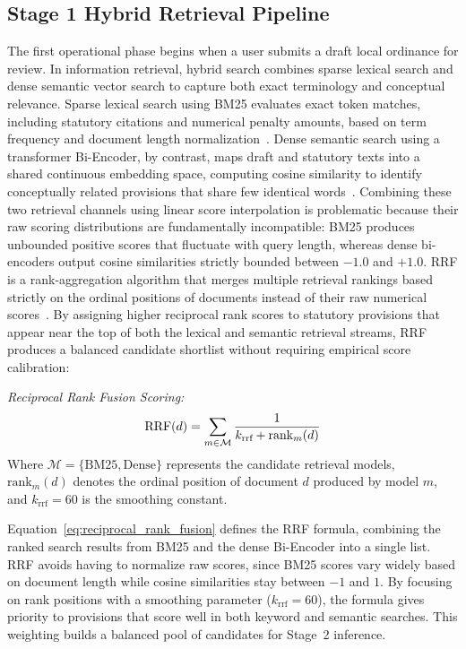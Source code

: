     \subsection{Stage 1 Hybrid Retrieval Pipeline}
    \label{sec:stage1_hybrid_pipeline}
    The first operational phase begins when a user submits a draft local ordinance for review. In information retrieval, hybrid search combines sparse lexical search and dense semantic vector search to capture both exact terminology and conceptual relevance. Sparse lexical search using BM25 evaluates exact token matches, including statutory citations and numerical penalty amounts, based on term frequency and document length normalization~\cite{robertson2009probabilistic}. Dense semantic search using a transformer Bi-Encoder, by contrast, maps draft and statutory texts into a shared continuous embedding space, computing cosine similarity to identify conceptually related provisions that share few identical words~\cite{reimers2019sentencebert}. Combining these two retrieval channels using linear score interpolation is problematic because their raw scoring distributions are fundamentally incompatible: BM25 produces unbounded positive scores that fluctuate with query length, whereas dense bi-encoders output cosine similarities strictly bounded between $-1.0$ and $+1.0$. RRF is a rank-aggregation algorithm that merges multiple retrieval rankings based strictly on the ordinal positions of documents instead of their raw numerical scores~\cite{cormack2009reciprocal}. By assigning higher reciprocal rank scores to statutory provisions that appear near the top of both the lexical and semantic retrieval streams, RRF produces a balanced candidate shortlist without requiring empirical score calibration:

    \noindent\textit{Reciprocal Rank Fusion Scoring:}
    \begin{equation}
        \text{RRF}(d) = \sum_{m \in \mathcal{M}} \frac{1}{k_{\text{rrf}} + \text{rank}_m(d)}
        \label{eq:reciprocal_rank_fusion}
        \eqcaption{Reciprocal Rank Fusion (RRF) Scoring}
    \end{equation}
    \noindent Where $\mathcal{M} = \{\text{BM25}, \text{Dense}\}$ represents the candidate retrieval models, $\text{rank}_m(d)$ denotes the ordinal position of document $d$ produced by model $m$, and $k_{\text{rrf}} = 60$ is the smoothing constant.

    Equation~\ref{eq:reciprocal_rank_fusion} defines the RRF formula, combining the ranked search results from BM25 and the dense Bi-Encoder into a single list. RRF avoids having to normalize raw scores, since BM25 scores vary widely based on document length while cosine similarities stay between $-1$ and $1$. By focusing on rank positions with a smoothing parameter ($k_{\text{rrf}} = 60$), the formula gives priority to provisions that score well in both keyword and semantic searches. This weighting builds a balanced pool of candidates for Stage~2 inference.

